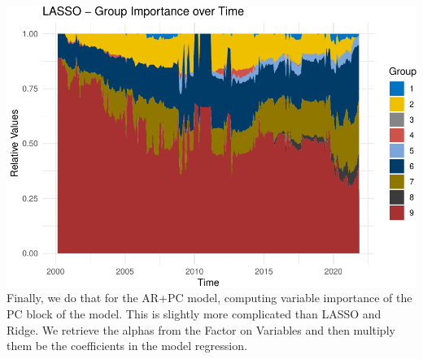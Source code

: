 \documentclass[
]{article}
\begin{document}
\includegraphics{Trabalho_Econo4_Q2_files/figure-latex/unnamed-chunk-33-1.pdf}
Finally, we do that for the AR+PC model, computing variable importance
of the PC block of the model. This is slightly more complicated than
LASSO and Ridge. We retrieve the alphas from the Factor on Variables and
then multiply them be the coefficients in the model regression.
\end{document}
